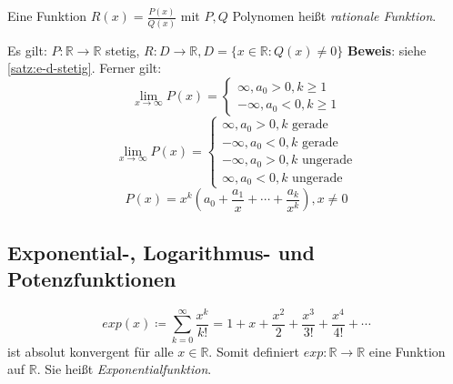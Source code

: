 \documentclass[ngerman,titlepage,twoside, parskip=half*]{scrreprt}
\newcommand*{\R}{\mathbb{R}}
\theoremstyle{plain}
\theoremstyle{definition}
\theoremstyle{remark}
\begin{document}
Eine Funktion $R(x)=\frac{P(x)}{Q(x)}$ mit $P,Q$ Polynomen heißt \emph{rationale Funktion}.

Es gilt: $P\colon\R\rightarrow\R$ stetig, $R\colon D\rightarrow\R, D=\{x\in \R\colon Q(x)\neq0\}$
\textbf{Beweis}: siehe \autoref{satz:e-d-stetig}. Ferner gilt:
\[\lim_{x\rightarrow\infty}P(x)=\begin{cases}\infty, a_0>0, k\geq 1\\-\infty, a_0<0, k\geq 1\end{cases}\]
\[\lim_{x\rightarrow\infty}P(x)=\begin{cases}\infty, a_0>0, k \text{ gerade}\\-\infty, a_0<0, k \text{ gerade}\\-\infty, a_0>0,
k \text{ ungerade}\\\infty, a_0<0, k \text{ ungerade}\end{cases}\]
\[P(x)=x^k(a_0+\frac{a_1}{x}+\cdots + \frac{a_k}{x^k}), x \neq 0\]

\subsection{Exponential-, Logarithmus- und Potenzfunktionen}

\[exp(x)\coloneqq\sum_{k=0}^\infty \frac{x^k}{k!}=1+x+\frac{x^2}{2}+\frac{x^3}{3!}+\frac{x^4}{4!}+\cdots\]
ist absolut konvergent für alle $x\in \R$. Somit definiert $exp\colon\R\rightarrow\R$ eine Funktion auf $\R$. Sie heißt
\emph{Exponentialfunktion}.
\end{document}

